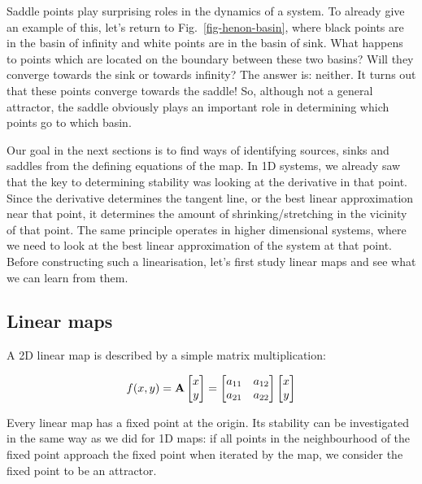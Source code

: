 Saddle points play surprising roles in the dynamics of a system. To already give an example of this, let's return to Fig.~\ref{fig-henon-basin}, where black points are in the basin of infinity and white points are in the basin of sink. What happens to points which are located on the boundary between these two basins? Will they converge towards the sink or towards infinity? The answer is: neither. It turns out that these points converge towards the saddle! So, although not a general attractor, the saddle obviously plays an important role in determining which points go to which basin.

Our goal in the next sections is to find ways of identifying sources, sinks and saddles from the defining equations of the map. In 1D systems, we already saw that the key to determining stability was looking at the derivative in that point. Since the derivative determines the tangent line, or the best linear approximation near that point, it determines the amount of shrinking/stretching in the vicinity of that point. The same principle operates in higher dimensional systems, where we need to look at the best linear approximation of the system at that point. Before constructing such a linearisation, let's first study linear maps and see what we can learn from them.

\subsection{Linear maps}

A 2D linear map is described by a simple matrix multiplication:

\begin{gather}
f(x,y) = {\bf A} 
\begin{bmatrix}
x \\
y
\end{bmatrix}
=
\begin{bmatrix}
a_{11} & a_{12} \\
a_{21} & a_{22}
\end{bmatrix}
\begin{bmatrix}
x \\
y
\end{bmatrix}
\end{gather} 

Every linear map has a fixed point at the origin. Its stability can be investigated in the same way as we did for 1D maps: if all points in the neighbourhood of the fixed point approach the fixed point when iterated by the map, we consider the fixed point to be an attractor.

